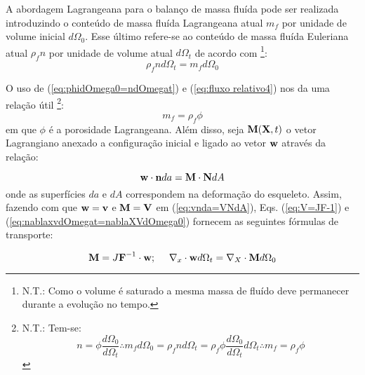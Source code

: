 \documentclass[
	11pt, %
	fleqn, %
	a4paper, %
]{LegrandOrangeBook}
\begin{document}
A abordagem Lagrangeana para o balanço de massa fluída pode ser realizada introduzindo o conteúdo de massa fluída Lagrangeana atual $m_f$ por unidade de volume inicial $d\Omega_0$. Esse último refere-se ao conteúdo de massa fluída Euleriana atual $\rho_fn$ por unidade de volume atual $d\Omega_t$ de acordo com \footnote{N.T.: Como o volume é saturado a mesma massa de fluído deve permanecer durante a evolução no tempo.}:
\begin{equation}
	\label{eq:fluxo relativo4}	
	\rho_f n d\Omega_t = m_f d\Omega_0
\end{equation}

O uso de (\ref{eq:phidOmega0=ndOmegat}) e (\ref{eq:fluxo relativo4}) nos da uma relação útil \footnote{N.T.: Tem-se:
\begin{displaymath}	
	n = \phi \dfrac{d\Omega_0}{d\Omega_t} \therefore m_fd\Omega_0 = \rho_f n d\Omega_t = \rho_f \phi \dfrac{d\Omega_0}{d\Omega_t}d\Omega_t \therefore m_f = \rho_f \phi
\end{displaymath}	
}:
\begin{equation}
	\label{eq:fluxo relativo5}	
	m_f = \rho_f \phi
\end{equation}
em que $\phi$ é a porosidade Lagrangeana. Além disso, seja $\textbf{M}(\textbf{X},t)$ o vetor Lagrangiano anexado a configuração inicial e ligado ao vetor $\textbf{w}$ através da relação:

\begin{equation}
	\label{eq:fluxo relativo6}	
	\textbf{w} \cdot \textbf{n} da = \textbf{M} \cdot \textbf{N} dA
\end{equation}
onde as superfícies $da$ e $dA$ correspondem na deformação do esqueleto. Assim, fazendo com que $\textbf{w}=\textbf{v}$ e $\textbf{M} = \textbf{V}$ em (\ref{eq:vnda=VNdA}), Eqs. (\ref{eq:V=JF-1}) e (\ref{eq:nablaxvdOmegat=nablaXVdOmega0}) fornecem as seguintes fórmulas de transporte:

\begin{equation}
	\label{eq:fluxo relativo7}	
	\textbf{M} = J\textbf{F}^{-1} \cdot \textbf{w};~~~~ \nabla_x \cdot \textbf{w} d\Omega_t = \nabla_X \cdot \textbf{M} d\Omega_0
\end{equation}
\end{document}
